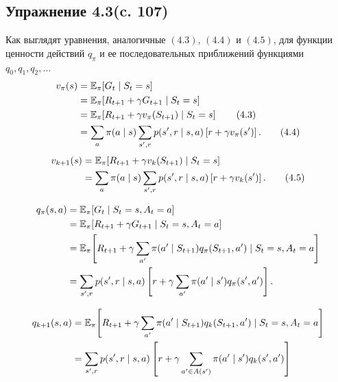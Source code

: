 \subsection{Упражнение 4.3(c. 107)}
Как выглядят уравнения, аналогичные $(4.3)$, $(4.4)$ и  $(4.5)$, для функции ценности действий $q_{\pi}$ и ее последовательных приближений функциями $q_0, q_1, q_2,\dots$
\begin{align}
v_{\pi}(s)
&= \mathbb{E}_{\pi}\!\left[ G_t \mid S_t = s \right] \notag\\
&= \mathbb{E}_{\pi}\!\left[ R_{t+1} + \gamma G_{t+1} \mid S_t = s \right] \notag \\
&= \mathbb{E}_{\pi}\!\left[ R_{t+1} + \gamma v_{\pi}(S_{t+1}) \mid S_t = s \right] \tag{4.3} \\
&= \sum_{a} \pi(a \mid s)
\sum_{s',r} p(s', r \mid s, a)
\left[ r + \gamma v_{\pi}(s') \right]. \tag{4.4}
\end{align}
\begin{align}
v_{k+1}(s)
&= \mathbb{E}_{\pi}\!\left[ R_{t+1} + \gamma v_k(S_{t+1}) \mid S_t = s \right] \notag\\
&= \sum_{a} \pi(a \mid s)
\sum_{s',r} p(s', r \mid s, a)
\left[ r + \gamma v_k(s') \right].
\tag{4.5}
\end{align}
\begin{solution}
    \begin{align}
    q_{\pi}(s,a)
    &= \mathbb{E}_{\pi}\!\left[ G_t \mid S_t = s, A_t = a \right] \notag\\
    &= \mathbb{E}_{\pi}\!\left[ R_{t+1} + \gamma G_{t+1}
    \mid S_t = s, A_t = a \right] \notag\\
    &= \mathbb{E}_{\pi}\!\left[
    R_{t+1} + \gamma
    \sum_{a'} \pi(a' \mid S_{t+1})
    q_{\pi}(S_{t+1},a')
    \mid S_t = s, A_t = a
    \right] \notag\\
    &=
    \sum_{s',r} p(s', r \mid s, a)
    \left[
    r + \gamma
    \sum_{a'} \pi(a' \mid s')
    q_{\pi}(s',a')
    \right].
    \notag
    \end{align}
    
    \begin{align}
    q_{k+1}(s,a)
    &=
    \mathbb{E}_{\pi}\!\left[
    R_{t+1}
    +
    \gamma
    \sum_{a'} \pi(a' \mid S_{t+1})
    q_k(S_{t+1},a')
    \mid S_t = s, A_t = a
    \right] \notag \\
    &=
    \sum_{s',r} p(s', r \mid s, a)
    \left[
    r + \gamma
    \sum_{a'\in A(s')} \pi(a' \mid s')
    q_k(s',a')
    \right] \notag
    \end{align}
\end{solution}

